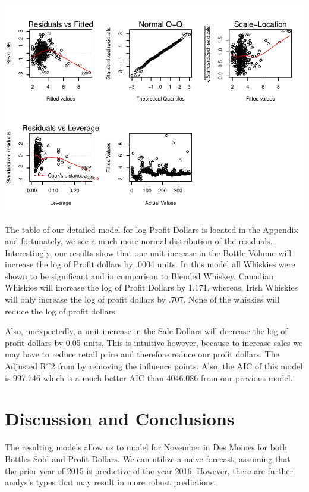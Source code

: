 \documentclass[]{elsarticle} %
\makeatletter
\def\maxwidth{\ifdim\Gin@nat@width>\linewidth\linewidth
\else\Gin@nat@width\fi}
\let\Oldincludegraphics\includegraphics
\renewcommand{\includegraphics}[1]{\Oldincludegraphics[width=\maxwidth]{#1}}
\makeatother
\begin{document}
\includegraphics{Final_Project_files/figure-latex/unnamed-chunk-22-1.pdf}

The table of our detailed model for log Profit Dollars is located in the
Appendix and fortunately, we see a much more normal distribution of the
residuals. Interestingly, our results show that one unit increase in the
Bottle Volume will increase the log of Profit dollars by .0004 units. In
this model all Whiskies were shown to be significant and in comparison
to Blended Whiskey, Canadian Whiskies will increase the log of Profit
Dollars by 1.171, whereas, Irish Whiskies will only increase the log of
profit dollars by .707. None of the whiskies will reduce the log of
profit dollars.

Also, unexpectedly, a unit increase in the Sale Dollars will decrease
the log of profit dollars by 0.05 units. This is intuitive however,
because to increase sales we may have to reduce retail price and
therefore reduce our profit dollars. The Adjusted R\^{}2 from by
removing the influence points. Also, the AIC of this model is 997.746
which is a much better AIC than 4046.086 from our previous model.

\section{Discussion and Conclusions}\label{discussion-and-conclusions}

The resulting models allow us to model for November in Des Moines for
both Bottles Sold and Profit Dollars. We can utilize a naive forecast,
assuming that the prior year of 2015 is predictive of the year 2016.
However, there are further analysis types that may result in more robust
predictions.
\end{document}
